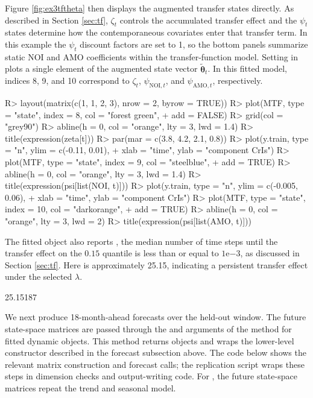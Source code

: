 \documentclass{jss}
\newcommand{\vect}[1]{\boldsymbol{#1}}
\begin{document}
Figure \ref{fig:ex3tftheta} then displays the augmented transfer states
directly. As described in Section \ref{sec:tf}, \(\zeta_t\) controls the
accumulated transfer effect and the \(\psi_t\) states determine how the
contemporaneous covariates enter that transfer term. In this example the
\(\psi_t\) discount factors are set to 1, so the bottom panels summarize static
NOI and AMO coefficients within the transfer-function model. Setting
 in  plots a single element of the
augmented state vector \(\tilde{\vect{\theta}}_t\). In this fitted model,
indices 8, 9, and 10 correspond to \(\zeta_t\), \(\psi_{\mathrm{NOI},t}\), and
\(\psi_{\mathrm{AMO},t}\), respectively.

\begin{CodeChunk}
\begin{CodeInput}
R> layout(matrix(c(1, 1, 2, 3), nrow = 2, byrow = TRUE))
R> plot(MTF, type = "state", index = 8, col = "forest green",
+       add = FALSE)
R> grid(col = "grey90")
R> abline(h = 0, col = "orange", lty = 3, lwd = 1.4)
R> title(expression(zeta[t]))
R> par(mar = c(3.8, 4.2, 2.1, 0.8))
R> plot(y.train, type = "n", ylim = c(-0.11, 0.01),
+      xlab = "time", ylab = "component CrIs")
R> plot(MTF, type = "state", index = 9, col = "steelblue",
+       add = TRUE)
R> abline(h = 0, col = "orange", lty = 3, lwd = 1.4)
R> title(expression(psi[list(NOI, t)]))
R> plot(y.train, type = "n", ylim = c(-0.005, 0.06),
+         xlab = "time", ylab = "component CrIs")
R> plot(MTF, type = "state", index = 10, col = "darkorange",
+       add = TRUE)
R> abline(h = 0, col = "orange", lty = 3, lwd = 2)
R> title(expression(psi[list(AMO, t)]))
\end{CodeInput}
\end{CodeChunk}

The fitted object also reports , the median number of time steps
until the transfer effect on the \(0.15\) quantile is less than or equal to
\(1\mathrm{e}{-3}\), as discussed in Section \ref{sec:tf}. Here
 is approximately 25.15, indicating a persistent transfer effect
under the selected \(\lambda\).
\begin{CodeChunk}
\begin{CodeOutput}
[1] 25.15187
\end{CodeOutput}
\end{CodeChunk}

We next produce 18-month-ahead forecasts over the held-out window. The
future state-space matrices are passed through the  and 
arguments of the  method for fitted dynamic objects. This
method returns  objects and wraps the lower-level
 constructor described in the forecast subsection above. The
code below shows the relevant matrix construction and forecast calls; the
replication script wraps these steps in dimension checks and output-writing
code. For , the future state-space matrices repeat the trend and
seasonal model.
\end{document}
